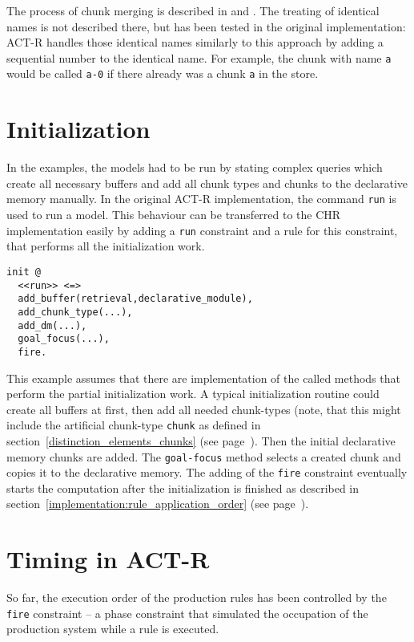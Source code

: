 The process of chunk merging is described in \cite[217, 71]{actr_reference} and \cite[3]{actr_tutorial}. The treating of identical names is not described there, but has been tested in the original implementation: ACT-R handles those identical names similarly to this approach by adding a sequential number to the identical name. For example, the chunk with name \lstinline|a| would be called \lstinline|a-0| if there already was a chunk \lstinline|a| in the store.

\section{Initialization}
\label{initialization}

In the examples, the models had to be run by stating complex queries which create all necessary buffers and add all chunk types and chunks to the declarative memory manually. In the original ACT-R implementation, the command \lstinline|run| is used to run a model. This behaviour can be transferred to the CHR implementation easily by adding a \lstinline|run| constraint and a rule for this constraint, that performs all the initialization work.

\begin{lstlisting}
init @ 
  <<run>> <=> 
  add_buffer(retrieval,declarative_module),
  add_chunk_type(...),
  add_dm(...),
  goal_focus(...),
  fire.
\end{lstlisting}

This example assumes that there are implementation of the called methods that perform the partial initialization work. A typical initialization routine could create all buffers at first, then add all needed chunk-types (note, that this might include the artificial chunk-type \lstinline|chunk| as defined in section~\ref{distinction_elements_chunks} (see page~\pageref{distinction_elements_chunks}). Then the initial declarative memory chunks are added. The \lstinline|goal-focus| method selects a created chunk and copies it to the declarative memory. The adding of the \lstinline|fire| constraint eventually starts the computation after the initialization is finished as described in section~\ref{implementation:rule_application_order} (see page~\pageref{implementation:rule_application_order}).

\section{Timing in ACT-R}

So far, the execution order of the production rules has been controlled by the \lstinline|fire| constraint -- a phase constraint that simulated the occupation of the production system while a rule is executed.

